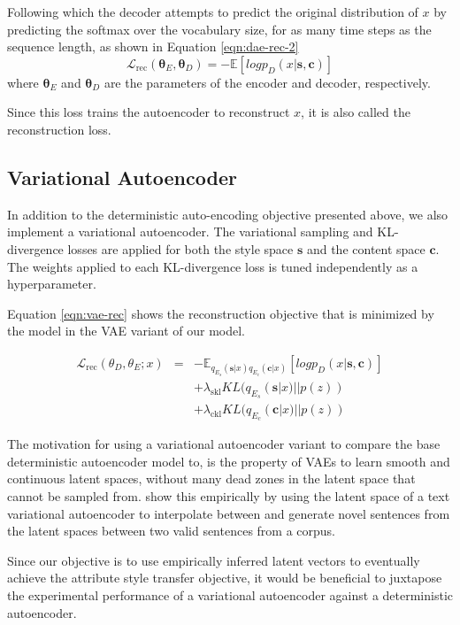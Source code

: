 Following which the decoder attempts to predict the original distribution of $x$ by predicting the softmax over the vocabulary size, for as many time steps as the sequence length, as shown in Equation \ref{eqn:dae-rec-2}
\begin{equation} \label{eqn:dae-rec-2}
	\mathcal{L}_\text{rec}(\bm\theta_E,\bm\theta_D)= -\mathbb{E}[log p_D(x|\bm s, \bm c)]
\end{equation}
where $\bm\theta_E$ and $\bm\theta_D$ are the parameters of the encoder and decoder, respectively.

Since this loss trains the autoencoder to reconstruct $x$, it is also called the reconstruction loss.


\subsection{Variational Autoencoder}

In addition to the deterministic auto-encoding objective presented above, we also implement a variational autoencoder. The variational sampling and KL-divergence losses are applied for both the style space $\bm s$ and the content space $\bm c$. The weights applied to each KL-divergence loss is tuned independently as a hyperparameter.

Equation \ref{eqn:vae-rec} shows the reconstruction objective that is minimized by the model in the VAE variant of our model.

\begin{eqnarray} \label{eqn:vae-rec}
	\mathcal{L}_\text{rec}(\theta_D, \theta_E; x) &=& \nonumber
	- \mathbb{E}_{q_{E_s}(\bm s|x) q_{E_c}(\bm c|x)} [log p_D(x|\bm s, \bm c)] \nonumber \\ & &
	+ \lambda_{\text{skl}} KL(q_{E_s}(\bm s|x)||p(z)) \nonumber \\ & &
	+ \lambda_{\text{ckl}} KL(q_{E_c}(\bm c|x)||p(z))
\end{eqnarray}

The motivation for using a variational autoencoder variant to compare the base deterministic autoencoder model to, is the property of VAEs to learn smooth and continuous latent spaces, without many dead zones in the latent space that cannot be sampled from. \cite{bowman2016generating} show this empirically by using the latent space of a text variational autoencoder to interpolate between and generate novel sentences from the latent spaces between two valid sentences from a corpus.

Since our objective is to use empirically inferred latent vectors to eventually achieve the attribute style transfer objective, it would be beneficial to juxtapose the experimental performance of a variational autoencoder against a deterministic autoencoder.


